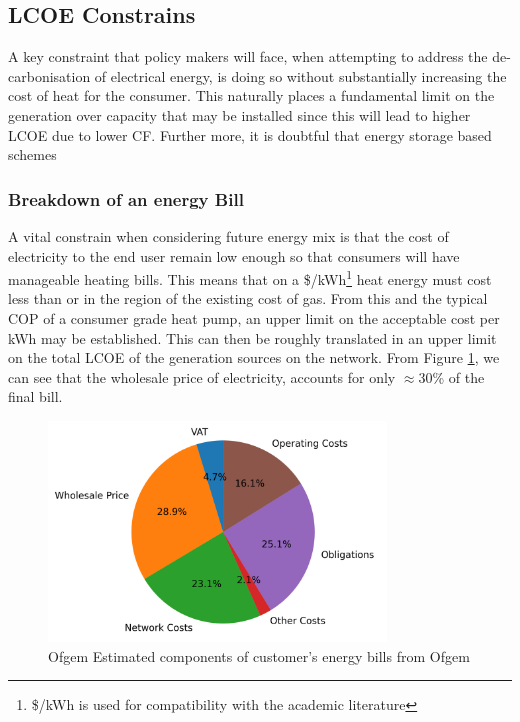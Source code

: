 \documentclass[11pt]{article}
\numberwithin{equation}{section}
\begin{document}
\subsection{LCOE Constrains}
\label{sec:orgeb46bfd}
A key constraint that policy makers will face, when attempting to address the de-carbonisation of electrical energy, is doing so without substantially increasing the cost of heat for the consumer. This naturally places a fundamental limit on the generation over capacity that may be installed since this will lead to higher LCOE due to lower CF. Further more, it is doubtful that energy storage based schemes

\subsubsection{Breakdown of an energy Bill}
\label{sec:orge650ed2}
A vital constrain when considering future energy mix is that the cost of electricity to the end user remain low enough so that consumers will have manageable heating bills. This means that on a \$/kWh\footnote{\$/kWh is used for compatibility with the academic literature} heat energy must cost less than or in the region of the existing cost of gas. From this and the typical COP of a consumer grade heat pump, an upper limit on the acceptable cost per kWh may be established. This can then be roughly translated in an upper limit on the total LCOE of the generation sources on the network. From Figure \ref{figPieBillBreakdown}, we can see that the wholesale price of electricity, accounts for only \(\approx\)30\% of the final bill.

\begin{figure}[H]
\centering
\includegraphics[width=0.8\textwidth]{./.ob-jupyter/78297f61231fd227439826e32eae830f0efb85e3.png}
\caption{\label{figPieBillBreakdown}Ofgem Estimated components of customer's energy bills from Ofgem \cite{ofgemBillBreakdown}}
\end{figure}
\end{document}
